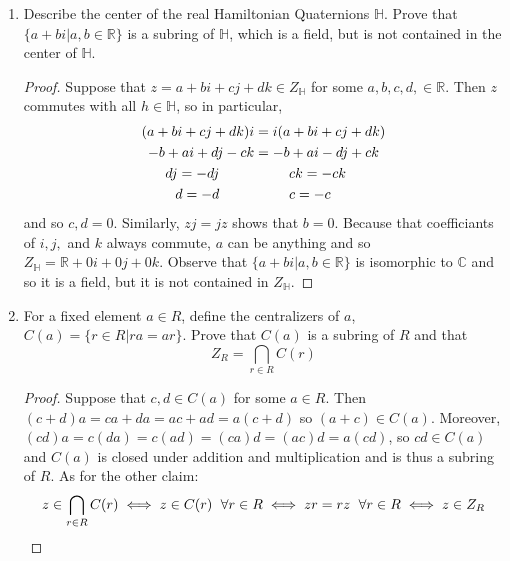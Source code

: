 \documentclass{report}
\newcommand{\R}{\mathbb{R}}
\newcommand{\C}{\mathbb{C}}
\begin{document}
\begin{enumerate}
\begin{proof}
        \noindent
        If $R$ is a division ring, then its center is clearly a field for a field is simply a commutative division ring and the center of a division ring must also be a division ring.
    \end{proof}


    \item Describe the center of the real Hamiltonian Quaternions $\mathbb{H}$. Prove that $\{a+bi|a,b\in \R\}$ is a subring of $\mathbb{H}$, which is a field, but is not contained in the center of $\mathbb{H}$.
    \begin{proof}
        Suppose that $z=a+bi+cj+dk\in Z_{\mathbb{H}}$ for some $a,b,c,d,\in\R$. Then $z$ commutes with all $h\in\mathbb{H}$, so in particular,
        \begin{align*}
            (a+bi+cj+dk)i &= i(a+bi+cj+dk)\\
            -b + ai + dj - ck &= -b + ai - dj + ck\\
            dj = -dj \hspace{25 pt}&\hspace{25 pt}ck=-ck\\
            d = -d \hspace{25 pt}&\hspace{25 pt}c=-c
        \end{align*}
        and so $c,d=0$. Similarly, $zj=jz$ shows that $b=0$. Because that coefficiants of $i,j,$ and $k$ always commute, $a$ can be anything and so $Z_{\mathbb{H}}=\R + 0i+0j+0k$. Observe that $\{a+bi|a,b\in \R\}$ is isomorphic to $\C$ and so it is a field, but it is not contained in $Z_\mathbb{H}$.
    \end{proof}

    
    \item For a fixed element $a\in R$, define the centralizers of $a$, $C(a)=\{r\in R|ra=ar\}$. Prove that $C(a)$ is a subring of $R$ and that
    $$Z_R = \bigcap_{r\in R} C(r)$$
    \begin{proof}
        Suppose that $c,d\in C(a)$ for some $a\in R$. Then $(c+d)a=ca+da=ac+ad=a(c+d)$ so $(a+c)\in C(a)$. Moreover, $(cd)a=c(da)=c(ad)=(ca)d=(ac)d=a(cd)$, so $cd\in C(a)$ and $C(a)$ is closed under addition and multiplication and is thus a subring of $R$. As for the other claim:
        $$z\in \bigcap_{r\in R} C(r) \iff z\in C(r)\hspace{6 pt} \forall r\in R\iff zr=rz \hspace{6 pt} \forall r\in R \iff z\in Z_R$$
    \end{proof}


\end{enumerate}
\end{document}
